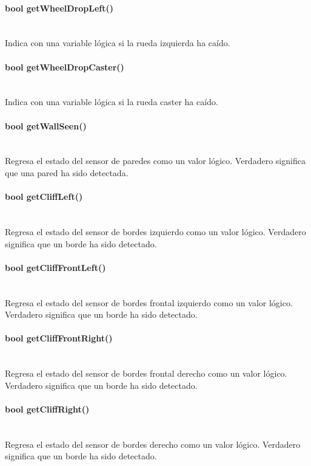 \documentclass[letterpaper,openright,12pt]{book}
\begin{document}
\paragraph{	bool getWheelDropLeft()}\mbox{}\\
Indica con una variable lógica si la rueda izquierda ha caído.\\
\paragraph{bool getWheelDropCaster()}\mbox{}\\
Indica con una variable lógica si la rueda caster ha caído.\\
\paragraph{bool getWallSeen()}\mbox{}\\
Regresa el estado del sensor de paredes como un valor lógico. Verdadero significa que una pared ha sido detectada.\\
\paragraph{bool getCliffLeft()}\mbox{}\\
Regresa el estado del sensor de bordes izquierdo como un valor lógico. Verdadero significa que un borde ha sido detectado.\\
\paragraph{bool getCliffFrontLeft()}\mbox{}\\
Regresa el estado del sensor de bordes frontal izquierdo como un valor lógico. Verdadero significa que un borde ha sido detectado.\\
\paragraph{bool getCliffFrontRight()}\mbox{}\\
Regresa el estado del sensor de bordes frontal derecho como un valor lógico. Verdadero significa que un borde ha sido detectado.\\
\paragraph{bool getCliffRight()}\mbox{}\\
Regresa el estado del sensor de bordes derecho como un valor lógico. Verdadero significa que un borde ha sido detectado.\\
\end{document}
